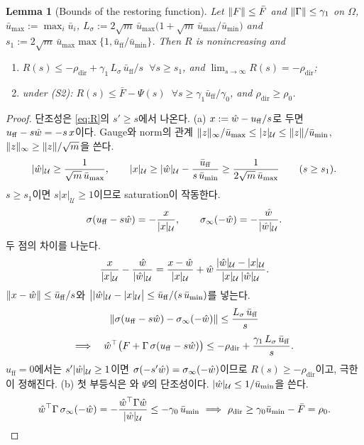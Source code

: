 \documentclass[11pt]{article}\usepackage[margin=1in]{geometry}\usepackage{amsmath,amssymb,amsthm,mathtools}\usepackage{graphicx}\graphicspath{{figures/}{../figures/}{figs/}{./}}\usepackage{enumitem}\usepackage{hyperref}\usepackage{cleveref}\usepackage{tikz}\usetikzlibrary{arrows.meta,positioning,calc,shapes.geometric}\usepackage{float}\usepackage[most]{tcolorbox}\usepackage{kotex}\usepackage{booktabs}\emergencystretch=1.6em\tolerance=2000 \crefname{assumption}{Assumption}{Assumptions}\Crefname{assumption}{Assumption}{Assumptions}\crefname{definition}{Definition}{Definitions}\Crefname{definition}{Definition}{Definitions}\crefname{proposition}{Proposition}{Propositions}\Crefname{proposition}{Proposition}{Propositions}\crefname{fact}{Fact}{Facts}\Crefname{fact}{Fact}{Facts} \newtheorem{assumption}{Assumption}\newtheorem{definition}{Definition}\newtheorem{lemma}{Lemma}\newtheorem{proposition}{Proposition}\newtheorem{theorem}{Theorem}\newtheorem{corollary}{Corollary}\newtheorem{fact}{Fact}\theoremstyle{remark}\newtheorem{remark}{Remark} \newcommand{\R}{\mathbb{R}}\newcommand{\U}{\mathcal U}
\begin{document}
\begin{lemma}[Bounds of the restoring function]
\label{lem:Rbounds}
Let $\lVert F\rVert\le\bar F$ and $\lVert \Gamma\rVert\le\gamma_1$ on $\Omega$, $\bar u_{\max}:=\max_i\bar u_i$, $L_\sigma:=2\sqrt m\,\bar u_{\max}\big(1+\sqrt m\,\bar u_{\max}/\bar u_{\min}\big)$ and $s_1:=2\sqrt m\,\bar u_{\max}\max\{1,\bar u_{\mathrm{ff}}/\bar u_{\min}\}$. Then $R$ is nonincreasing and
\begin{enumerate}[label=(\alph*)]
\item $R(s)\le-\rho_{\mathrm{dir}}+\gamma_1\,L_\sigma\,\bar u_{\mathrm{ff}}/s$ $\ \forall s\ge s_1$, and $\lim_{s\to\infty}R(s)=-\rho_{\mathrm{dir}}$;
\item under (S2): $R(s)\le\bar F-\Psi(s)$ $\ \forall s\ge\gamma_1\bar u_{\mathrm{ff}}/\gamma_0$, and $\rho_{\mathrm{dir}}\ge\rho_0$.
\end{enumerate}
\end{lemma}

\begin{proof}
단조성은 \eqref{eq:R}의 $s'\ge s$에서 나온다. (a) $x:=\hat w-u_{\mathrm{ff}}/s$로 두면 $u_{\mathrm{ff}}-s\hat w=-s\,x$이다. Gauge와 norm의 관계 $\norm{z}_\infty/\bar u_{\max}\le|z|_{\U}\le\norm{z}/\bar u_{\min}$, $\lVert z\rVert_\infty\ge\lVert z\rVert/\sqrt m$을 쓴다.
\[
|\what|_{\U}\ge\frac{1}{\sqrt m\,\bar u_{\max}},\qquad |x|_{\U}\ge|\what|_{\U}-\frac{\bar u_{\mathrm{ff}}}{s\,\bar u_{\min}}\ge\frac{1}{2\sqrt m\,\bar u_{\max}}\qquad(s\ge s_1).
\]
$s\ge s_1$이면 $s|x|_{\U}\ge1$이므로 saturation이 작동한다.
\[
\sigma(u_{\mathrm{ff}}-s\what)=-\frac{x}{|x|_{\U}},\qquad \sigma_\infty(-\what)=-\frac{\what}{|\what|_{\U}} .
\]
두 점의 차이를 나눈다.
\[
\frac{x}{|x|_{\U}}-\frac{\what}{|\what|_{\U}}=\frac{x-\what}{|x|_{\U}}+\what\,\frac{|\what|_{\U}-|x|_{\U}}{|x|_{\U}\,|\what|_{\U}} .
\]
$\lVert x-\hat w\rVert\le\bar u_{\mathrm{ff}}/s$와 $\big||\what|_{\U}-|x|_{\U}\big|\le\bar u_{\mathrm{ff}}/(s\,\bar u_{\min})$를 넣는다.
\[
\lVert \sigma(u_{\mathrm{ff}}-s\hat w)-\sigma_\infty(-\hat w)\rVert\le\frac{L_\sigma\,\bar u_{\mathrm{ff}}}{s}
\]
\[
\Longrightarrow\quad \hat w^\top\big(F+\Gamma\,\sigma(u_{\mathrm{ff}}-s\hat w)\big)\le-\rho_{\mathrm{dir}}+\frac{\gamma_1\,L_\sigma\,\bar u_{\mathrm{ff}}}{s} .
\]
$u_{\mathrm{ff}}=0$에서는 $s'|\what|_{\U}\ge1$이면 $\sigma(-s'\hat w)=\sigma_\infty(-\hat w)$이므로 $R(s)\ge-\rho_{\mathrm{dir}}$이고, 극한이 정해진다. (b) 첫 부등식은 와 $\Psi$의 단조성이다. $|\what|_{\U}\le1/\bar u_{\min}$을 쓴다.
\[
\what^\top\Gamma\,\sigma_\infty(-\what)=-\frac{\what^\top\Gamma\what}{|\what|_{\U}}\le-\gamma_0\,\bar u_{\min}\ \Longrightarrow\ \rho_{\mathrm{dir}}\ge\gamma_0\bar u_{\min}-\bar F=\rho_0 .
\]
\end{proof}
\end{document}
